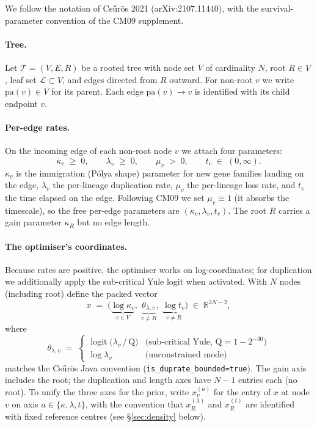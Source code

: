 \documentclass[11pt]{article}
\newcommand{\R}{\mathbb{R}}
\newcommand{\Tree}{\mathcal{T}}
\newcommand{\Leaves}{\mathcal{L}}
\newcommand{\pa}{\mathrm{pa}}
\newcommand{\troot}{R}
\newcommand{\rate}{\kappa}             %
\newcommand{\dup}{\lambda}             %
\newcommand{\loss}{\mu}                %
\newcommand{\edgelen}{t}               %
\DeclareMathOperator{\logit}{logit}
\theoremstyle{definition}
\begin{document}
We follow the notation of Cs\H{u}r\"os 2021 (arXiv:2107.11440), with
the survival-parameter convention of the CM09 supplement.

\paragraph{Tree.}
Let $\Tree = (V, E, \troot)$ be a rooted tree with node set $V$ of
cardinality $N$, root $\troot \in V$, leaf set $\Leaves \subset V$,
and edges directed from $\troot$ outward.  For non-root $v$ we write
$\pa(v) \in V$ for its parent. Each edge $\pa(v)\to v$ is identified
with its child endpoint $v$.

\paragraph{Per-edge rates.}
On the incoming edge of each non-root node $v$ we attach four
parameters:
\begin{equation}
\rate_v \;\ge\; 0,\qquad
\dup_v \;\ge\; 0,\qquad
\loss_v \;>\; 0,\qquad
\edgelen_v \;\in\; (0, \infty).
\label{eq:rates}
\end{equation}
$\rate_v$ is the immigration (Pólya shape) parameter for new gene
families landing on the edge, $\dup_v$ the per-lineage duplication
rate, $\loss_v$ the per-lineage loss rate, and $\edgelen_v$ the time
elapsed on the edge. Following CM09 we set $\loss_v \equiv 1$ (it
absorbs the timescale), so the free per-edge parameters are
$(\rate_v, \dup_v, \edgelen_v)$. The root $\troot$ carries a gain
parameter $\rate_\troot$ but no edge length.

\paragraph{The optimiser's coordinates.}
Because rates are positive, the optimiser works on log-coordinates;
for duplication we additionally apply the sub-critical Yule logit
when activated. With $N$ nodes (including root) define the packed
vector
\begin{equation}
x \;=\; \bigl(\underbrace{\log\rate_v}_{v\in V},\;
            \underbrace{\theta_{\dup,v}}_{v\neq\troot},\;
            \underbrace{\log\edgelen_v}_{v\neq\troot}\bigr)
\;\in\; \R^{3N-2},
\label{eq:packing}
\end{equation}
where
\begin{equation}
\theta_{\dup,v} \;=\;
\begin{cases}
\logit\bigl(\dup_v \,/\, \mathrm{Q}\bigr) & \text{(sub-critical Yule, $\mathrm{Q}=1-2^{-30}$)}\\
\log\dup_v & \text{(unconstrained mode)}
\end{cases}
\label{eq:theta-dup}
\end{equation}
matches the Cs\H{u}r\"os Java convention
(\texttt{is\_duprate\_bounded=true}). The gain axis includes the root;
the duplication and length axes have $N-1$ entries each (no root). To
unify the three axes for the prior, write $x^{(a)}_v$ for the entry
of $x$ at node $v$ on axis $a\in\{\rate, \dup, \edgelen\}$, with the
convention that $x^{(\dup)}_\troot$ and $x^{(\edgelen)}_\troot$ are
identified with fixed reference centres (see \S\ref{sec:density}
below).
\end{document}
